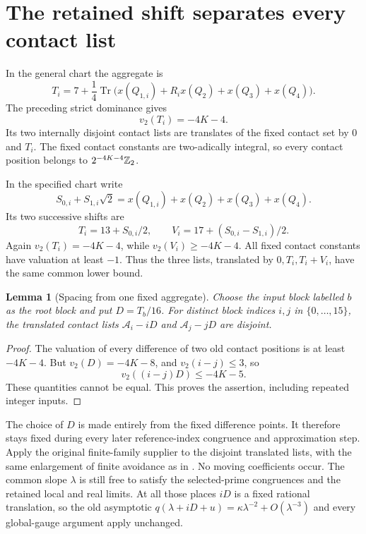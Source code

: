 \documentclass[11pt]{article}
\newtheorem{lemma}{Lemma}\newtheorem{theorem}[lemma]{Theorem}
\begin{document}
\section{The retained shift separates every contact list}

In the general chart the aggregate is
\[
 T_i=7+\frac14\operatorname{Tr}
       \bigl(x(Q_{1,i})+R_i x(Q_2)+x(Q_3)+x(Q_4)\bigr).
\]
The preceding strict dominance gives
\begin{equation}\label{Tval}
                         v_2(T_i)=-4K-4.
\end{equation}
Its two internally disjoint contact lists are translates of the fixed
contact set by \(0\) and \(T_i\). The fixed contact constants are
two-adically integral, so every contact position belongs to
\(2^{-4K-4}\mathbb Z_2\).

In the specified chart write
\[
 S_{0,i}+S_{1,i}\sqrt2=x(Q_{1,i})+x(Q_2)+x(Q_3)+x(Q_4).
\]
Its two successive shifts are
\[
 T_i=13+S_{0,i}/2,\qquad V_i=17+(S_{0,i}-S_{1,i})/2.
\]
Again \(v_2(T_i)=-4K-4\), while
\(v_2(V_i)\ge-4K-4\). All fixed contact constants have valuation
at least \(-1\). Thus the three lists, translated by \(0,T_i,T_i+V_i\),
have the same common lower bound.

\begin{lemma}[Spacing from one fixed aggregate]\label{separation}
Choose the input block labelled \(b\) as the root block and put
\(D=T_b/16\). For distinct block indices \(i,j\) in
\(\{0,\ldots,15\}\), the translated contact lists
\(\mathcal A_i-iD\) and \(\mathcal A_j-jD\) are disjoint.
\end{lemma}
\begin{proof}
The valuation of every difference of two old contact positions is
at least \(-4K-4\). But \(v_2(D)=-4K-8\), and
\(v_2(i-j)\le3\), so
\[
                  v_2((i-j)D)\le-4K-5.
\]
These quantities cannot be equal. This proves the assertion,
including repeated integer inputs.
\end{proof}

The choice of \(D\) is made entirely from the fixed difference
points. It therefore stays fixed during every later reference-index
congruence and approximation step. Apply the original finite-family
supplier to the disjoint translated lists, with the same enlargement
of finite avoidance as in \cite{Progression}. No moving coefficients
occur. The common slope \(\lambda\) is still free to satisfy the
selected-prime congruences and the retained local and real limits.
At all those places \(iD\) is a fixed rational translation, so the
old asymptotic \(q(\lambda+iD+u)=\kappa\lambda^{-2}
+O(\lambda^{-3})\) and every global-gauge argument apply unchanged.
\end{document}
